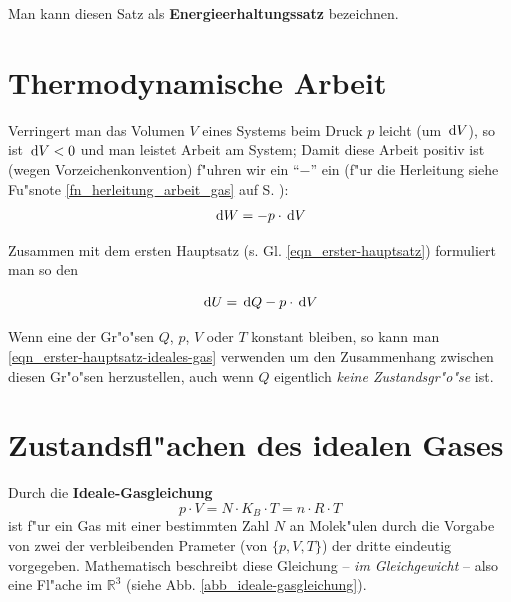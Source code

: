 Man kann diesen Satz als \textbf{Energieerhaltungssatz} bezeichnen.





\section{Thermodynamische Arbeit}
\label{kap_thermodynamische-arbeit}

Verringert man das Volumen $V$ eines Systems beim Druck $p$ leicht (um
$\, \mathrm{d} V$), so ist $\, \mathrm{d} V < 0$ und man leistet Arbeit am System;
Damit diese Arbeit positiv ist (wegen Vorzeichenkonvention) f"uhren wir
ein "`$-$"' ein (f"ur die Herleitung siehe Fu"snote
\ref{fn_herleitung_arbeit_gas} auf S. \pageref{fn_herleitung_arbeit_gas}):
\begin{equation}
   \label{eqn_thermodynamische-arbeit}
   \, \mathrm{d} W = - p \cdot \, \mathrm{d} V
\end{equation}


Zusammen mit dem ersten Hauptsatz
(s. Gl. \eqref{eqn_erster-hauptsatz}) formuliert man so den

\begin{Def}
   \begin{equation}
      \label{eqn_erster-hauptsatz-ideales-gas}
      \, \mathrm{d} U = \, \mathrm{d} Q - p \cdot \, \mathrm{d} V
   \end{equation}
\end{Def}

Wenn eine der Gr"o"sen $Q$, $p$, $V$ oder $T$ konstant bleiben, so kann
man \eqref{eqn_erster-hauptsatz-ideales-gas} verwenden um den
Zusammenhang zwischen diesen Gr"o"sen herzustellen, auch wenn $Q$
eigentlich \emph{keine Zustandsgr"o"se} ist.










\section{Zustandsfl"achen des idealen Gases}
\label{kap_zustandsflachen-des-idealen-gases}

Durch die \textbf{Ideale-Gasgleichung}
\begin{equation}
   \label{eqn_ideale-gasgleichung}
   \boxed{
p \cdot V = N \cdot K_B \cdot T = n\cdot R \cdot T
}
\end{equation}
ist f"ur ein Gas mit einer bestimmten Zahl $N$ an Molek"ulen durch die
Vorgabe von zwei der verbleibenden Prameter (von $\{p, V, T \}$) der
dritte eindeutig vorgegeben. Mathematisch beschreibt diese Gleichung
-- \emph{im Gleichgewicht} -- also eine Fl"ache im $\mathbb R^3$
(siehe Abb. \ref{abb_ideale-gasgleichung}).



